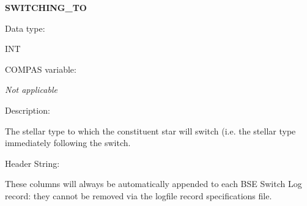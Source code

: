 \medskip
\begin{minipage}{\textwidth} %
    \textbf{SWITCHING\_TO} \\
    \parskip 0pt
    \begin{minipage}[t][][b]{8.25em}Data type:\end{minipage}
    \begin{minipage}[t][][b]{\dimexpr\textwidth-8.75em}INT\end{minipage}\vfill
    \begin{minipage}[t][][b]{8.25em}COMPAS variable:\end{minipage}
    \begin{minipage}[t][][b]{\dimexpr\textwidth-8.75em}\textit{Not applicable}\end{minipage}\vfill
    \begin{minipage}[t][][b]{8.25em}Description:\end{minipage}
    \begin{minipage}[t][][b]{\dimexpr\textwidth-8.75em}\raggedright{The stellar type to which the constituent star will switch (i.e. the stellar type immediately following the switch.}\end{minipage}\vfill
    \begin{minipage}[t][][b]{8.25em}Header String:\end{minipage}
    \begin{minipage}[t][][b]{\dimexpr\textwidth-8.75em}\raggedright{}\end{minipage}\vfill
\end{minipage}

\bigskip
These columns will always be automatically appended to each BSE Switch Log record: they cannot be removed via the logfile record specifications file.
